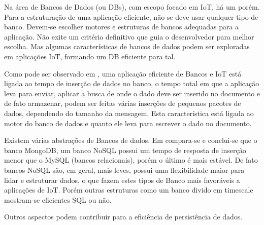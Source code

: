 Na área de Bancos de Dados (ou DBs), com escopo focado em IoT, há um porém. Para a estruturação de uma aplicação eficiente, não se deve usar qualquer tipo de banco. Devem-se escolher motores e estruturas de bancos adequadas para a aplicação. Não exite um critério definitivo que guia o desenvolvedor para melhor escolha. Mas algumas características de bancos de dados podem ser exploradas em aplicações IoT, formando um DB eficiente para tal.

Como pode ser observado em \cite{Damodaran}, uma aplicação eficiente de Bancos e IoT está ligada ao tempo de inserção de dados no banco,  o tempo total em que a aplicação leva para enviar, aplicar a busca de onde o dado deve ser inserido no documento e de fato armazenar, podem ser feitas várias inserções de pequenos pacotes de dados, dependendo do tamanho da mensagem. Esta característica está ligada ao motor do banco de dados e quanto ele leva para escrever o dado no documento.

Existem várias abstrações de Bancos de dados. Em \cite{Rautmare-Bhalerao} compara-se e conclui-se que o banco MongoDB, um banco NoSQL possui um tempo de resposta de inserção menor que o MySQL (bancos relacionais), porém o último é mais estável. De fato bancos NoSQL são, em geral, mais leves, possui uma flexibilidade maior para lidar e estruturar dados, o que fazem estes tipos de Banco mais favoráveis a aplicações de IoT. Porém outras estruturas como um banco divido em timescale mostram-se eficientes SQL ou não.

Outros aspectos podem contribuir para a eficiência de persistência de dados. %

